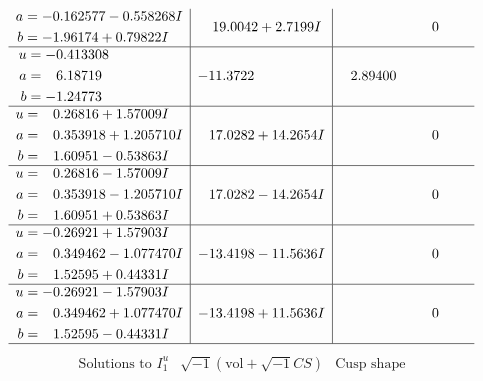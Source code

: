 \documentclass[1p]{elsarticle_modified}
\theoremstyle{definition}
\newcommand{\I}{\sqrt{-1}}
\begin{document}
$$\begin{array}{c|c|c}
\begin{aligned}
a &= -0.162577 - 0.558268 I \\
b &= -1.96174 + 0.79822 I\end{aligned}
 & \phantom{-}19.0042 + 2.7199 I & \phantom{-0.000000 } 0 \\ \hline\begin{aligned}
u &= -0.413308\phantom{ +0.000000I} \\
a &= \phantom{-}6.18719\phantom{ +0.000000I} \\
b &= -1.24773\phantom{ +0.000000I}\end{aligned}
 & -11.3722\phantom{ +0.000000I} & \phantom{-}2.89400\phantom{ +0.000000I} \\ \hline\begin{aligned}
u &= \phantom{-}0.26816 + 1.57009 I \\
a &= \phantom{-}0.353918 + 1.205710 I \\
b &= \phantom{-}1.60951 - 0.53863 I\end{aligned}
 & \phantom{-}17.0282 + 14.2654 I & \phantom{-0.000000 } 0 \\ \hline\begin{aligned}
u &= \phantom{-}0.26816 - 1.57009 I \\
a &= \phantom{-}0.353918 - 1.205710 I \\
b &= \phantom{-}1.60951 + 0.53863 I\end{aligned}
 & \phantom{-}17.0282 - 14.2654 I & \phantom{-0.000000 } 0 \\ \hline\begin{aligned}
u &= -0.26921 + 1.57903 I \\
a &= \phantom{-}0.349462 - 1.077470 I \\
b &= \phantom{-}1.52595 + 0.44331 I\end{aligned}
 & -13.4198 - 11.5636 I & \phantom{-0.000000 } 0 \\ \hline\begin{aligned}
u &= -0.26921 - 1.57903 I \\
a &= \phantom{-}0.349462 + 1.077470 I \\
b &= \phantom{-}1.52595 - 0.44331 I\end{aligned}
 & -13.4198 + 11.5636 I & \phantom{-0.000000 } 0\\
 \hline 
 \end{array}$$\newpage$$\begin{array}{c|c|c}  
\text{Solutions to }I^u_{1}& \I (\text{vol} + \sqrt{-1}CS) & \text{Cusp shape}\\
 \hline 
\begin{aligned}

\end{aligned}
\end{array}$$
\end{document}
